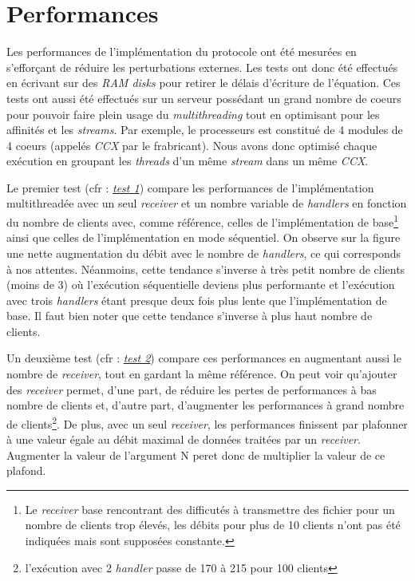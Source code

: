 \documentclass[../main.tex]{subfiles}
\begin{document}
\section{Performances}
\label{sec:performances}

Les performances de l'implémentation du protocole ont été mesurées en s'efforçant de réduire les perturbations externes. Les tests ont donc été 
effectués en écrivant sur des \textit{RAM disks} pour retirer le délais d'écriture de l'équation. Ces tests ont aussi été effectués sur un serveur 
possédant un grand nombre de coeurs pour pouvoir faire plein usage du \textit{multithreading} tout en optimisant pour les affinités et les \textit{streams}.
Par exemple, le processeurs est constitué de 4 modules de 4 coeurs (appelés \textit{CCX} par le frabricant). Nous avons donc optimisé chaque exécution
en groupant les \textit{threads} d'un même \textit{stream} dans un même \textit{CCX}.

Le premier test (cfr : \hyperref[sec:plot_1_recv]{\textit{test 1}}) compare les performances de l'implémentation multithreadée avec un seul \textit{receiver} et un nombre variable de \textit{handlers} 
en fonction du nombre de clients avec, comme référence, celles de l'implémentation de base\footnote{Le \textit{receiver} base rencontrant des 
difficutés à transmettre des fichier pour un nombre de clients trop élevés, les débits pour plus de 10 clients n'ont pas été indiquées mais sont 
supposées constante.} ainsi que celles de l'implémentation en mode séquentiel.          %
On observe sur la figure une nette augmentation du débit avec le nombre de \textit{handlers}, ce qui corresponds à nos attentes. Néanmoins, cette 
tendance s'inverse à très petit nombre de clients (moins de 3) où l'exécution séquentielle deviens plus performante et l'exécution avec trois \textit{handlers} étant 
presque deux fois plus lente que l'implémentation de base. Il faut bien noter que cette tendance s'inverse à plus haut nombre de clients.

Un deuxième test (cfr : \hyperref[sec:plot_mul_recv]{\textit{test 2}}) compare ces performances en augmentant aussi le nombre de \textit{receiver}, tout en gardant la même référence. On peut voir qu'ajouter 
des \textit{receiver} permet, d'une part, de réduire les pertes de performances à bas nombre de clients et, d'autre part, d'augmenter les performances à 
grand nombre de clients\footnote{l'exécution avec 2 \textit{handler} passe de 170  à 215 pour 100 clients}. De plus, avec un seul 
\textit{receiver}, les performances finissent par plafonner à une valeur égale au débit maximal de données traitées par un \textit{receiver}. Augmenter 
la valeur de l'argument N peret donc de multiplier la valeur de ce plafond.
\end{document}

